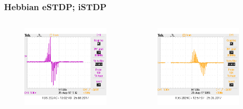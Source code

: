 \documentclass[12pt, aspectratio=169]{beamer}
\begin{document}
\begin{frame}
\frametitle{Hebbian eSTDP; iSTDP}
\begin{columns}[c] %

\begin{figure}
\includegraphics[width=1\linewidth]{hebb_output_single}
\end{figure}
\begin{figure}
\includegraphics[width=1\linewidth]{inh_output_single}
\end{figure}
\end{columns}
\end{frame}
\end{document}
